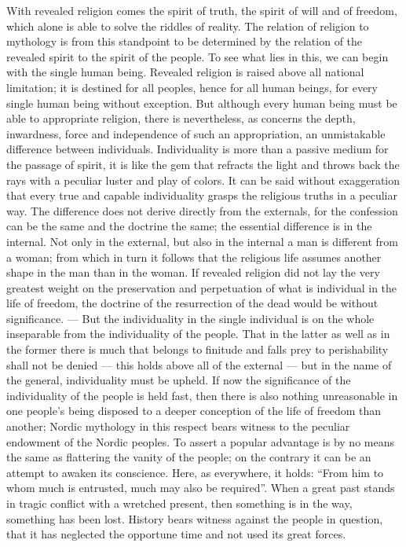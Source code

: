 \documentclass[12pt,a4paper,openany]{book}
\newcommand{\opage}[1]{\marginnote{\footnotesize\textit{[#1]}}}
\begin{document}
With revealed religion comes the spirit of truth,
the spirit of will and of freedom, which alone is able
to solve the riddles of reality. The relation of religion
to mythology is from this standpoint to be determined
by the relation of the revealed spirit to the spirit of the people.
To see what lies in this, we can begin
with the single human being. Revealed religion
is raised above all national limitation; it is destined
for all peoples, hence for all human beings, for
every single human being without exception. But although
every human being must be able to appropriate religion, there
is nevertheless, as concerns the depth, inwardness, force and independence
of such an appropriation, an unmistakable
difference between individuals. Individuality
is more than a passive medium for the passage of spirit,
it is like the gem that refracts the light and
throws back the rays with a peculiar luster and
play of colors. It can be said without exaggeration that every
true and capable individuality grasps the religious truths
in a peculiar way. The difference does not derive
directly from the externals, for the confession can
be the same and the doctrine the same; the essential
difference is in the internal. Not only in the external,
but also in the internal a man is
\setcounter{footnote}{0}%
\opage{436}different from a woman; from which in turn it follows that the religious
life assumes another shape in the man than in the woman.
If revealed religion did not lay the
very greatest weight on the preservation and perpetuation of what is individual
in the life of freedom, the doctrine of the resurrection of the dead would
be without significance. --- But the individuality in
the single individual is on the whole inseparable from the individuality of the people.
That in the latter as well as in the former there is much
that belongs to finitude and falls prey to perishability
shall not be denied --- this holds above all
of the external --- but in the name of the general, individuality
must be upheld. If now the significance of the individuality of the people
is held fast, then there is also nothing unreasonable
in one people's being disposed to a deeper conception
of the life of freedom than another; Nordic mythology
in this respect bears witness to the peculiar
endowment of the Nordic peoples. To assert a popular
advantage is by no means the same as
flattering the vanity of the people; on the contrary it can be
an attempt to awaken its conscience. Here, as everywhere, it holds:
``From him to whom much is entrusted,
much may also be required''. When a great past stands
in tragic conflict with a wretched present, then something
is in the way, something has been lost. History bears witness
against the people in question, that it has neglected the
opportune time and not used its great forces.
\end{document}
